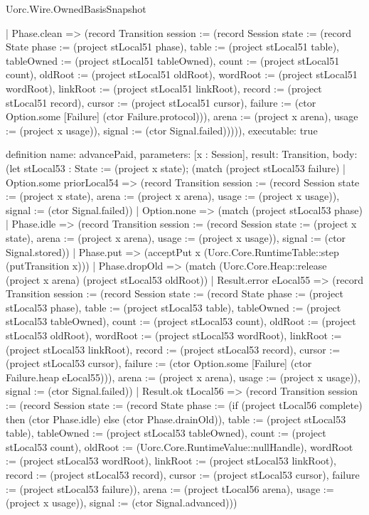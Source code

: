 \begin{lexlean}{Uorc.Wire.OwnedBasisSnapshot}
\begin{semanticmodule}
{      | Phase.clean => (record Transition {session := (record Session {state := (record State {phase := (project stLocal51 phase), table := (project stLocal51 table), tableOwned := (project stLocal51 tableOwned), count := (project stLocal51 count), oldRoot := (project stLocal51 oldRoot), wordRoot := (project stLocal51 wordRoot), linkRoot := (project stLocal51 linkRoot), record := (project stLocal51 record), cursor := (project stLocal51 cursor), failure := (ctor Option.some [Failure] (ctor Failure.protocol))}), arena := (project x arena), usage := (project x usage)}), signal := (ctor Signal.failed)})))),
  executable: true
}

definition{
  name: advancePaid,
  parameters: [x : Session],
  result: Transition,
  body: (let stLocal53 : State := (project x state); (match (project stLocal53 failure)
    | Option.some priorLocal54 => (record Transition {session := (record Session {state := (project x state), arena := (project x arena), usage := (project x usage)}), signal := (ctor Signal.failed)})
    | Option.none => (match (project stLocal53 phase)
      | Phase.idle => (record Transition {session := (record Session {state := (project x state), arena := (project x arena), usage := (project x usage)}), signal := (ctor Signal.stored)})
      | Phase.put => (acceptPut x (Uorc.Core.RuntimeTable::step (putTransition x)))
      | Phase.dropOld => (match (Uorc.Core.Heap::release (project x arena) (project stLocal53 oldRoot))
        | Result.error eLocal55 => (record Transition {session := (record Session {state := (record State {phase := (project stLocal53 phase), table := (project stLocal53 table), tableOwned := (project stLocal53 tableOwned), count := (project stLocal53 count), oldRoot := (project stLocal53 oldRoot), wordRoot := (project stLocal53 wordRoot), linkRoot := (project stLocal53 linkRoot), record := (project stLocal53 record), cursor := (project stLocal53 cursor), failure := (ctor Option.some [Failure] (ctor Failure.heap eLocal55))}), arena := (project x arena), usage := (project x usage)}), signal := (ctor Signal.failed)})
        | Result.ok tLocal56 => (record Transition {session := (record Session {state := (record State {phase := (if (project tLocal56 complete) then (ctor Phase.idle) else (ctor Phase.drainOld)), table := (project stLocal53 table), tableOwned := (project stLocal53 tableOwned), count := (project stLocal53 count), oldRoot := (Uorc.Core.RuntimeValue::nullHandle), wordRoot := (project stLocal53 wordRoot), linkRoot := (project stLocal53 linkRoot), record := (project stLocal53 record), cursor := (project stLocal53 cursor), failure := (project stLocal53 failure)}), arena := (project tLocal56 arena), usage := (project x usage)}), signal := (ctor Signal.advanced)}))
}
\end{semanticmodule}
\end{lexlean}
